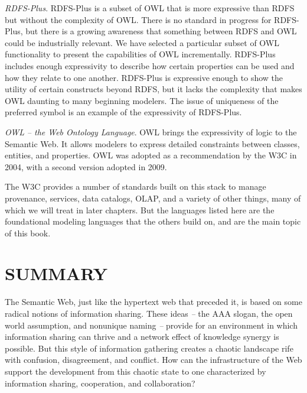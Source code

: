 \emph{RDFS-Plus}. RDFS-Plus is a subset of OWL that is more expressive
than RDFS but without the complexity of OWL. There is no standard in
progress for RDFS-Plus, but there is a growing awareness that something
between RDFS and OWL could be industrially relevant. We have selected a
particular subset of OWL functionality to present the capabilities of
OWL incrementally. RDFS-Plus includes enough expressivity to describe
how certain properties can be used and how they relate to one another.
RDFS-Plus is expressive enough to show the utility of certain constructs
beyond RDFS, but it lacks the complexity that makes OWL daunting to many
beginning modelers. The issue of uniqueness of the preferred symbol is
an example of the expressivity of RDFS-Plus.

\emph{OWL} \emph{-- the Web Ontology Language}. OWL brings the
expressivity of logic to the Semantic Web. It allows modelers to express
detailed constraints between classes, entities, and properties. OWL was
adopted as a recommendation by the W3C in 2004, with a second version
adopted in 2009.

The W3C provides a number of standards built on this stack to manage
provenance, services, data catalogs, OLAP, and a variety of other things, many 
of which we will treat in later chapters.  But the languages listed here
are the foundational modeling languages that the others build on, 
and are the main topic of this book. 

\section{SUMMARY}

The Semantic Web, just like the hypertext web that preceded it, is based
on some radical notions of information sharing. These ideas \emph{--}
the AAA slogan, the open world assumption, and nonunique naming
\emph{--} provide for an environment in which information sharing can
thrive and a network effect of knowledge synergy is possible. But this
style of information gathering creates a chaotic landscape rife with
confusion, disagreement, and conflict. How can the infrastructure of the
Web support the development from this chaotic state to one characterized
by information sharing, cooperation, and collaboration?

